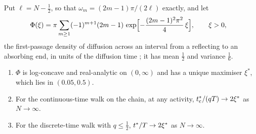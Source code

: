 Put $\ell=N-\tfrac12$, so that $\omega_m=(2m-1)\pi/(2\ell)$ exactly, and let
\begin{equation}\label{s5_modes:eq-1d-continuum}
  \Phi(\xi)=\pi\sum_{m\ge1}(-1)^{m+1}(2m-1)\,
  \exp\Bigl[-\frac{(2m-1)^{2}\pi^{2}}{4}\,\xi\Bigr],\qquad \xi>0 ,
\end{equation}
the first-passage density of diffusion across an interval from a reflecting to an absorbing end, in units of the
diffusion time \citep{Redner2001}; it has mean $\tfrac12$ and variance $\tfrac16$.

\begin{proposition}\label{s5_modes:prop-1d-limit}
\begin{enumerate}
\item[(a)] $\Phi$ is log-concave and real-analytic on $(0,\infty)$ and has a unique maximiser $\xi^{*}$, which lies
in $(0.05,0.5)$.
\item[(b)] For the continuous-time walk on the chain, at any activity, $t^{*}_{\mathrm{c}}/(qT)\to2\xi^{*}$ as $N\to\infty$.
\item[(c)] For the discrete-time walk with $q\le\tfrac12$, $t^{*}/T\to2\xi^{*}$ as $N\to\infty$.
\end{enumerate}
\end{proposition}

